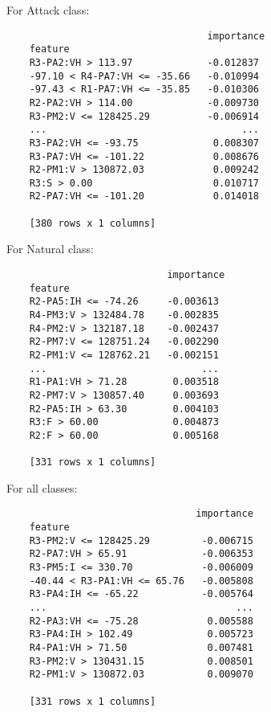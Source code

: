 For Attack class:
\begin{verbatim}
                                   importance
    feature                                 
    R3-PA2:VH > 113.97             -0.012837
    -97.10 < R4-PA7:VH <= -35.66   -0.010994
    -97.43 < R1-PA7:VH <= -35.85   -0.010306
    R2-PA2:VH > 114.00             -0.009730
    R3-PM2:V <= 128425.29          -0.006914
    ...                                  ...
    R3-PA2:VH <= -93.75             0.008307
    R3-PA7:VH <= -101.22            0.008676
    R2-PM1:V > 130872.03            0.009242
    R3:S > 0.00                     0.010717
    R2-PA7:VH <= -101.20            0.014018
    
    [380 rows x 1 columns]
\end{verbatim}

For Natural class: 
\begin{verbatim}
                            importance
    feature                          
    R2-PA5:IH <= -74.26     -0.003613
    R4-PM3:V > 132484.78    -0.002835
    R4-PM2:V > 132187.18    -0.002437
    R2-PM7:V <= 128751.24   -0.002290
    R2-PM1:V <= 128762.21   -0.002151
    ...                           ...
    R1-PA1:VH > 71.28        0.003518
    R2-PM7:V > 130857.40     0.003693
    R2-PA5:IH > 63.30        0.004103
    R3:F > 60.00             0.004873
    R2:F > 60.00             0.005168
    
    [331 rows x 1 columns]
\end{verbatim}

For all classes:
\begin{verbatim}
                                 importance
    feature                                
    R3-PM2:V <= 128425.29         -0.006715
    R2-PA7:VH > 65.91             -0.006353
    R3-PM5:I <= 330.70            -0.006009
    -40.44 < R3-PA1:VH <= 65.76   -0.005808
    R3-PA4:IH <= -65.22           -0.005764
    ...                                 ...
    R2-PA3:VH <= -75.28            0.005588
    R3-PA4:IH > 102.49             0.005723
    R4-PA1:VH > 71.50              0.007481
    R3-PM2:V > 130431.15           0.008501
    R2-PM1:V > 130872.03           0.009070
    
    [331 rows x 1 columns]
\end{verbatim}